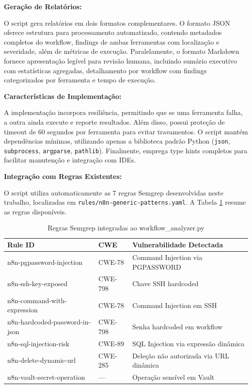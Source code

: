 \documentclass[12pt,a4paper]{article}
\begin{document}
\textbf{Geração de Relatórios:}

O script gera relatórios em dois formatos complementares. O formato JSON oferece estrutura para processamento automatizado, contendo metadados completos do workflow, findings de ambas ferramentas com localização e severidade, além de métricas de execução. Paralelamente, o formato Markdown fornece apresentação legível para revisão humana, incluindo sumário executivo com estatísticas agregadas, detalhamento por workflow com findings categorizados por ferramenta e tempo de execução.

\textbf{Características de Implementação:}

A implementação incorpora resiliência, permitindo que se uma ferramenta falha, a outra ainda execute e reporte resultados. Além disso, possui proteção de timeout de 60 segundos por ferramenta para evitar travamentos. O script mantém dependências mínimas, utilizando apenas a biblioteca padrão Python (\texttt{json}, \texttt{subprocess}, \texttt{argparse}, \texttt{pathlib}). Finalmente, emprega type hints completos para facilitar manutenção e integração com IDEs.

\textbf{Integração com Regras Existentes:}

O script utiliza automaticamente as 7 regras Semgrep desenvolvidas neste trabalho, localizadas em \texttt{rules/n8n-generic-patterns.yaml}. A Tabela \ref{tab:rules-summary} resume as regras disponíveis.

\begin{table}[H]
\centering \small
\caption{Regras Semgrep integradas ao workflow\_analyzer.py}
\label{tab:rules-summary}
\begin{tabular}{@{}lll@{}}
\toprule
\textbf{Rule ID} & \textbf{CWE} & \textbf{Vulnerabilidade Detectada} \\ \midrule
n8n-pgpassword-injection & CWE-78 & Command Injection via PGPASSWORD \\
n8n-ssh-key-exposed & CWE-798 & Chave SSH hardcoded \\
n8n-command-with-expression & CWE-78 & Command Injection em SSH \\
n8n-hardcoded-password-in-json & CWE-798 & Senha hardcoded em workflow \\
n8n-sql-injection-risk & CWE-89 & SQL Injection via expressão dinâmica \\
n8n-delete-dynamic-url & CWE-285 & Deleção não autorizada via URL dinâmica \\
n8n-vault-secret-operation & — & Operação sensível em Vault \\ \bottomrule
\end{tabular}
\end{table}
\end{document}
